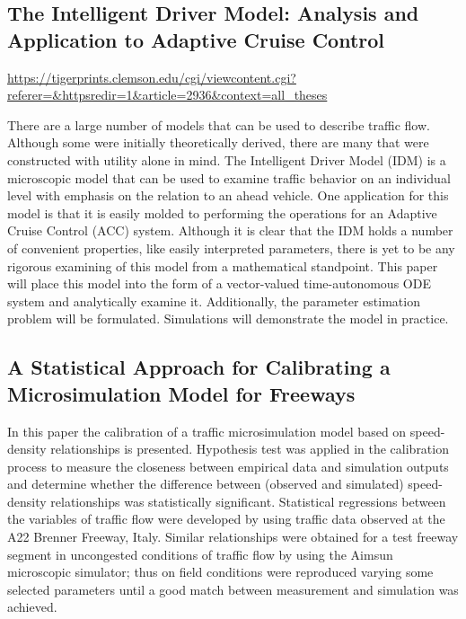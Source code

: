 \documentclass{article}
\begin{document}
\subsection*{The Intelligent Driver Model: Analysis and Application to Adaptive Cruise Control}
\url{https://tigerprints.clemson.edu/cgi/viewcontent.cgi?referer=&httpsredir=1&article=2936&context=all_theses}

There are a large number of models that can be used to describe traffic flow. Although some were initially theoretically derived, there are many that were constructed with utility alone in mind. The Intelligent Driver Model (IDM) is a microscopic model that can be used to examine traffic behavior on an individual level with emphasis on the relation to an ahead vehicle. One application for this model is that it is easily molded to performing the operations for an Adaptive Cruise Control (ACC) system. Although it is clear that the IDM holds a number of convenient properties, like easily interpreted parameters, there is yet to be any rigorous examining of this model from a mathematical standpoint. This paper will place this model into the form of a vector-valued time-autonomous ODE system and analytically examine it. Additionally, the parameter estimation problem will be formulated. Simulations will demonstrate the model in practice.

\subsection*{A Statistical Approach for Calibrating a Microsimulation Model for Freeways \cite{statsCalibMicro}}
In this paper the calibration of a traffic microsimulation model based on speed-density relationships is presented. Hypothesis test was applied in the calibration process to measure the closeness between empirical data and simulation outputs and determine whether the difference between (observed and simulated) speed- density relationships was statistically significant. Statistical regressions between the variables of traffic flow were developed by using traffic data observed at the A22 Brenner Freeway, Italy. Similar relationships were obtained for a test freeway segment in uncongested conditions of traffic flow by using the Aimsun microscopic simulator; thus on field conditions were reproduced varying some selected parameters until a good match between measurement and simulation was achieved. %
\end{document}
